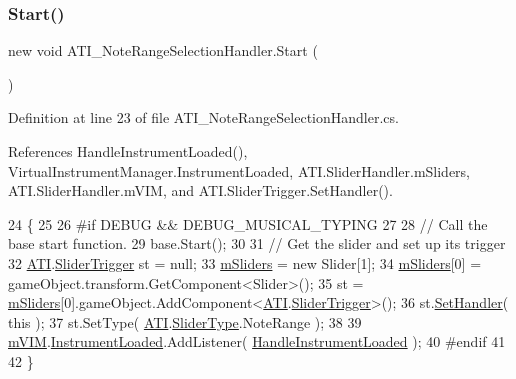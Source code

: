 \subsubsection{\texorpdfstring{Start()}{Start()}}
{\footnotesize\ttfamily new void A\+T\+I\+\_\+\+Note\+Range\+Selection\+Handler.\+Start (\begin{DoxyParamCaption}{ }\end{DoxyParamCaption})\hspace{0.3cm}{\ttfamily [private]}}



Definition at line 23 of file A\+T\+I\+\_\+\+Note\+Range\+Selection\+Handler.\+cs.



References Handle\+Instrument\+Loaded(), Virtual\+Instrument\+Manager.\+Instrument\+Loaded, A\+T\+I.\+Slider\+Handler.\+m\+Sliders, A\+T\+I.\+Slider\+Handler.\+m\+V\+IM, and A\+T\+I.\+Slider\+Trigger.\+Set\+Handler().


\begin{DoxyCode}
24     \{
25 
26 \textcolor{preprocessor}{#if DEBUG && DEBUG\_MUSICAL\_TYPING}
27 
28         \textcolor{comment}{// Call the base start function.}
29         base.Start();
30 
31         \textcolor{comment}{// Get the slider and set up its trigger}
32         \hyperlink{class_a_t_i}{ATI}.\hyperlink{class_a_t_i_1_1_slider_trigger}{SliderTrigger} st = null;
33         \hyperlink{class_a_t_i_1_1_slider_handler_a038a487fbd701cb786e77c210830be76}{mSliders} = \textcolor{keyword}{new} Slider[1];
34         \hyperlink{class_a_t_i_1_1_slider_handler_a038a487fbd701cb786e77c210830be76}{mSliders}[0] = gameObject.transform.GetComponent<Slider>();
35         st = \hyperlink{class_a_t_i_1_1_slider_handler_a038a487fbd701cb786e77c210830be76}{mSliders}[0].gameObject.AddComponent<\hyperlink{class_a_t_i}{ATI}.\hyperlink{class_a_t_i_1_1_slider_trigger}{SliderTrigger}>();
36         st.\hyperlink{class_a_t_i_1_1_slider_trigger_a258f79d013266d0c82a5382525adcdef}{SetHandler}( \textcolor{keyword}{this} );
37         st.SetType( \hyperlink{class_a_t_i}{ATI}.\hyperlink{class_a_t_i_ac4c6056a99cbd16ff0d292d33b038b9b}{SliderType}.NoteRange );
38 
39         \hyperlink{class_a_t_i_1_1_slider_handler_a5d19b4fb92b71c25a667defdda60213f}{mVIM}.\hyperlink{group___v_i_m_events_gad79b789b020d7e4a8c149ec653c0b97f}{InstrumentLoaded}.AddListener( 
      \hyperlink{class_a_t_i___note_range_selection_handler_a4063aee2ca06e3fbe11f4cd899b5581f}{HandleInstrumentLoaded} );
40 \textcolor{preprocessor}{#endif}
41 
42     \}
\end{DoxyCode}
\mbox{\label{class_a_t_i___note_range_selection_handler_ad1368483644433a2e1149790664676e8}} 
